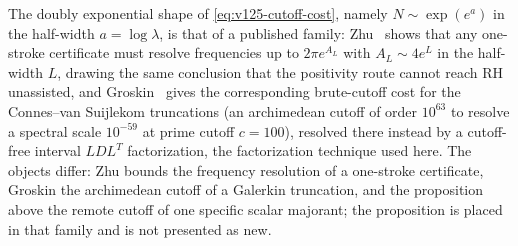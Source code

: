 
The doubly exponential shape of \eqref{eq:v125-cutoff-cost}, namely
$N\sim\exp(e^{a})$ in the half-width $a=\log\lambda$, is that of a
published family: Zhu~\cite{Zhu2026} shows that any one-stroke
certificate must resolve frequencies up to $2\pi e^{A_L}$ with
$A_L\sim4e^{L}$ in the half-width $L$, drawing the same conclusion that
the positivity route cannot reach RH unassisted, and
Groskin~\cite{Groskin2026} gives the corresponding brute-cutoff cost
for the Connes--van Suijlekom truncations (an archimedean cutoff of
order $10^{63}$ to resolve a spectral scale $10^{-59}$ at prime cutoff
$c=100$), resolved there instead by a cutoff-free interval $LDL^{T}$
factorization, the factorization technique used here.
The objects differ: Zhu bounds the frequency resolution of a
one-stroke certificate, Groskin the archimedean cutoff of a Galerkin
truncation, and the proposition above the remote cutoff of one specific
scalar majorant; the proposition is placed in that family and is not
presented as new.
